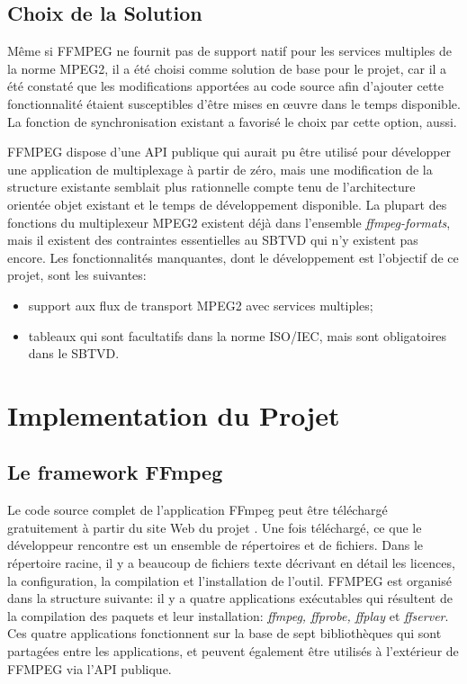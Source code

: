 \documentclass[12pt,a4paper]{article}
\begin{document}
\subsection{Choix de la Solution}

Même si FFMPEG ne fournit pas de support natif pour les services multiples de la norme MPEG2, il a été choisi comme solution de base pour le projet, car il a été constaté que les modifications apportées au code source afin d'ajouter cette fonctionnalité étaient susceptibles d'être mises en œuvre dans le temps disponible. La fonction de synchronisation existant a favorisé le choix par cette option, aussi.

FFMPEG dispose d'une API publique qui aurait pu être utilisé pour développer une application de multiplexage à partir de zéro, mais une modification de la structure existante semblait plus rationnelle compte tenu de l'architecture orientée objet existant et le temps de développement disponible. La plupart des fonctions du multiplexeur MPEG2 existent déjà dans l'ensemble \textit{ffmpeg-formats}, mais il existent des contraintes essentielles au SBTVD qui n'y existent pas encore. Les fonctionnalités manquantes, dont le développement est l'objectif de ce projet, sont les suivantes:

\begin{itemize}
\item{support aux flux de transport MPEG2 avec services multiples;} 
\item{tableaux qui sont facultatifs dans la norme ISO/IEC, mais sont obligatoires dans le SBTVD.}
\end{itemize}

\section{Implementation du Projet}
\label{implementation}

\subsection{Le framework FFmpeg}

Le code source complet de l'application FFmpeg peut être téléchargé gratuitement à partir du site Web du projet \cite{ffmpeg}. Une fois téléchargé, ce que le développeur rencontre est un ensemble de répertoires et de fichiers. Dans le répertoire racine, il y a beaucoup de fichiers texte décrivant en détail les licences, la configuration, la compilation et l'installation de l'outil. FFMPEG est organisé dans la structure suivante: il y a quatre applications exécutables qui résultent de la compilation des paquets et leur installation: \textit{ffmpeg, ffprobe, ffplay} et \textit{ffserver}. Ces quatre applications fonctionnent sur la base de sept bibliothèques qui sont partagées entre les applications, et peuvent également être utilisés à l'extérieur de FFMPEG via l'API publique.
\end{document}
